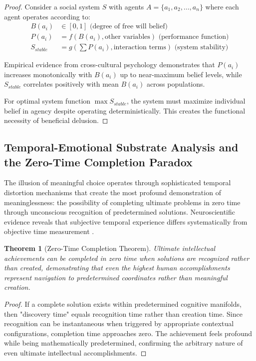 \documentclass[12pt,a4paper]{article}
\newtheorem{theorem}{Theorem}[section]
\begin{document}
\begin{proof}
Consider a social system $S$ with agents $A = \{a_1, a_2, \ldots, a_n\}$ where each agent operates according to:
\begin{align}
B(a_i) &\in [0,1] \text{ (degree of free will belief)} \\
P(a_i) &= f(B(a_i), \text{other variables}) \text{ (performance function)} \\
S_{stable} &= g\left(\sum P(a_i), \text{interaction terms}\right) \text{ (system stability)}
\end{align}

Empirical evidence from cross-cultural psychology \citep{chiu1994individual} demonstrates that $P(a_i)$ increases monotonically with $B(a_i)$ up to near-maximum belief levels, while $S_{stable}$ correlates positively with mean $B(a_i)$ across populations.

For optimal system function $\max S_{stable}$, the system must maximize individual belief in agency despite operating deterministically. This creates the functional necessity of beneficial delusion.
\end{proof}

\subsection{Temporal-Emotional Substrate Analysis and the Zero-Time Completion Paradox}

The illusion of meaningful choice operates through sophisticated temporal distortion mechanisms that create the most profound demonstration of meaninglessness: the possibility of completing ultimate problems in zero time through unconscious recognition of predetermined solutions. Neuroscientific evidence reveals that subjective temporal experience differs systematically from objective time measurement \citep{eagleman2008human}.

\begin{theorem}[Zero-Time Completion Theorem]
Ultimate intellectual achievements can be completed in zero time when solutions are recognized rather than created, demonstrating that even the highest human accomplishments represent navigation to predetermined coordinates rather than meaningful creation.
\end{theorem}

\begin{proof}
If a complete solution exists within predetermined cognitive manifolds, then "discovery time" equals recognition time rather than creation time. Since recognition can be instantaneous when triggered by appropriate contextual configurations, completion time approaches zero. The achievement feels profound while being mathematically predetermined, confirming the arbitrary nature of even ultimate intellectual accomplishments.
\end{proof}
\end{document}

